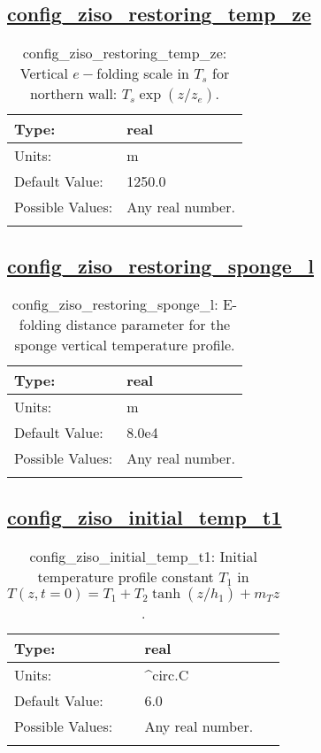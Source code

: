 \subsection[config\_ziso\_restoring\_temp\_ze]{\hyperref[sec:nm_tab_ziso]{config\_ziso\_restoring\_temp\_ze}}
\label{subsec:nm_sec_config_ziso_restoring_temp_ze}
\begin{center}
\begin{longtable}{| p{2.0in} || p{4.0in} |}
    \hline
    Type: & real \\
    \hline
    Units: & \si{m} \\
    \hline
    Default Value: & 1250.0 \\
    \hline
    Possible Values: & Any real number. \\
    \hline
    \caption{config\_ziso\_restoring\_temp\_ze: Vertical $e-$folding scale in $T_s$ for northern wall: $T_s \exp(z/z_e)$.}
\end{longtable}
\end{center}
\subsection[config\_ziso\_restoring\_sponge\_l]{\hyperref[sec:nm_tab_ziso]{config\_ziso\_restoring\_sponge\_l}}
\label{subsec:nm_sec_config_ziso_restoring_sponge_l}
\begin{center}
\begin{longtable}{| p{2.0in} || p{4.0in} |}
    \hline
    Type: & real \\
    \hline
    Units: & \si{m} \\
    \hline
    Default Value: & 8.0e4 \\
    \hline
    Possible Values: & Any real number. \\
    \hline
    \caption{config\_ziso\_restoring\_sponge\_l: E-folding distance parameter for the sponge vertical temperature profile.}
\end{longtable}
\end{center}
\subsection[config\_ziso\_initial\_temp\_t1]{\hyperref[sec:nm_tab_ziso]{config\_ziso\_initial\_temp\_t1}}
\label{subsec:nm_sec_config_ziso_initial_temp_t1}
\begin{center}
\begin{longtable}{| p{2.0in} || p{4.0in} |}
    \hline
    Type: & real \\
    \hline
    Units: & \si{^{circ}.C} \\
    \hline
    Default Value: & 6.0 \\
    \hline
    Possible Values: & Any real number. \\
    \hline
    \caption{config\_ziso\_initial\_temp\_t1: Initial temperature profile constant $T_1$ in $T(z,t=0) = T_1 + T_2 \tanh(z/h_1) + m_T z$.}
\end{longtable}
\end{center}
